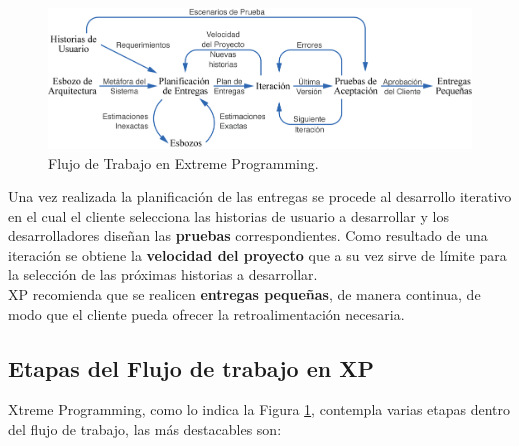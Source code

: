 \begin{figure}[ht]
	\centering
	\includegraphics{imagenes/XP-Flujo.png}
	\caption{Flujo de Trabajo en Extreme Programming. \citep{Metodologia_XP_grafico_flujograma_2006}}
	\label{fig:xp_project}
\end{figure}

Una vez realizada la planificación de las entregas se procede al desarrollo iterativo en el cual el cliente selecciona las historias de usuario a desarrollar y los desarrolladores diseñan las \textbf{pruebas} correspondientes. Como resultado de una iteración se obtiene la \textbf{velocidad del proyecto} que a su vez sirve de límite para la selección de las próximas historias a desarrollar. \\

XP recomienda que se realicen \textbf{entregas pequeñas}, de manera continua, de modo que el cliente pueda ofrecer la retroalimentación necesaria.

\subsection{Etapas del Flujo de trabajo en XP}
Xtreme Programming, como lo indica la Figura \ref{fig:xp_project}, contempla varias etapas dentro del flujo de trabajo, las más destacables son:

